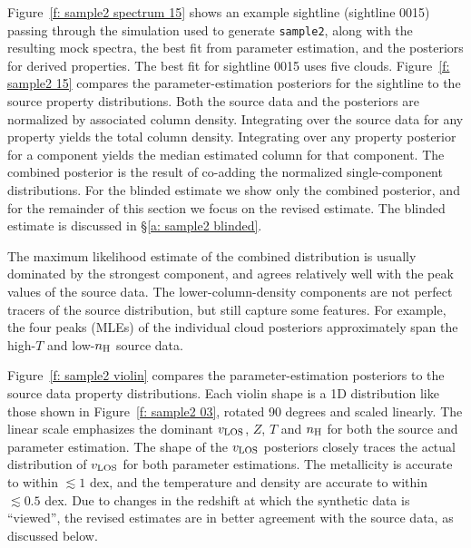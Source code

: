 \documentclass[fleqn,usenatbib]{mnras}
\begin{document}
Figure~\ref{f: sample2 spectrum 15} shows an example sightline (sightline 0015) passing through the simulation used to generate \texttt{sample2},
along with the resulting mock spectra,
the best fit from parameter estimation,
and the posteriors for derived properties.
The best fit for sightline 0015 uses five clouds.
Figure~\ref{f: sample2 15} compares the parameter-estimation posteriors for the sightline to the source property distributions. 
Both the source data and the posteriors are normalized by associated  column density.
Integrating over the source data for any property yields the total  column density.
Integrating over any property posterior for a component yields the median estimated  column for that component.
The combined posterior is the result of co-adding the normalized single-component distributions.
For the blinded estimate we show only the combined posterior, and for the remainder of this section we focus on the revised estimate.
The blinded estimate is discussed in \S\ref{a: sample2 blinded}.

The maximum likelihood estimate of the combined distribution is usually dominated by the strongest component,
and agrees relatively well with the peak values of the source data.
The lower-column-density components are not perfect tracers of the source distribution, but still capture some features.
For example, the four peaks (MLEs) of the individual cloud posteriors approximately span the high-$T$ and low-$n_{\rm H}$ source data.

Figure~\ref{f: sample2 violin} compares the parameter-estimation posteriors to the source data property distributions.
Each violin shape is a 1D distribution like those shown in Figure~\ref{f: sample2 03}, rotated 90 degrees and scaled linearly.
The linear scale emphasizes the dominant $v_{\rm LOS}$, $Z$, $T$ and $n_{\rm H}$ for both the source and parameter estimation.
The shape of the $v_{\rm LOS}$ posteriors closely traces the actual distribution of $v_{\rm LOS}$ for both parameter estimations.
The metallicity is accurate to within $\lesssim 1$ dex,
and the temperature and density are accurate to within $\lesssim 0.5$ dex.
Due to changes in the redshift at which the synthetic data is ``viewed'', the revised estimates are in better agreement with the source data,
as discussed below.
\end{document}
